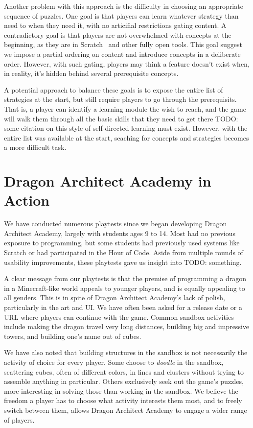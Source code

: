 \documentclass{sig-alternate}
\newcommand{\TODO}[1]{{\color{red} TODO: #1}}
\newcommand{\gametitle}{{\color{RoyalPurple} Dragon Architect Academy}}
\begin{document}
Another problem with this approach is the difficulty in choosing an appropriate sequence of puzzles.
One goal is that players can learn whatever strategy than need to when they need it, with no articifial restrictions gating content.
A contradictory goal is that players are not overwhelmed with concepts at the beginning, as they are in Scratch~\cite{resnick2009scratch} and other fully open tools.
This goal suggest we impose a partial ordering on content and introduce concepts in a deliberate order.
However, with such gating, players may think a feature doesn't exist when, in reality, it's hidden behind several prerequisite concepts.

A potential approach to balance these goals is to expose the entire list of strategies at the start, but still require players to go through the prerequisits.
That is, a player can identify a learning module the wish to reach, and the game will walk them through all the basic skills that they need to get there \TODO{some citation on this style of self-directed learning must exist}.
However, with the entire list was available at the start, seaching for concepts and strategies becomes a more difficult task.

\section{\gametitle{} in Action}
\label{sec:action}
We have conducted numerous playtests since we began developing \gametitle{}, largely with students ages 9 to 14. 
Most had no previous exposure to programming, but some students had previously used systems like Scratch or had participated in the Hour of Code.
Aside from multiple rounds of usability improvements, these playtests gave us insight into \TODO{something}.

A clear message from our playtests is that the premise of programming a dragon in a Minecraft-like world appeals to younger players, and is equally appealing to all genders. 
This is in spite of \gametitle{}'s lack of polish, particularly in the art and UI. 
We have often been asked for a release date or a URL where players can continue with the game. 
Common sandbox activities include making the dragon travel very long distances, building big and impressive towers, and building one's name out of cubes.

We have also noted that building structures in the sandbox is not necessarily the activity of choice for every player. 
Some choose to \emph{doodle} in the sandbox, scattering cubes, often of different colors, in lines and clusters without trying to assemble anything in particular.
Others exclusively seek out the game's puzzles, more interesting in solving those than working in the sandbox.
We believe the freedom a player has to choose what activity interests them most, and to freely switch between them, allows \gametitle{} to engage a wider range of players.
\end{document}
